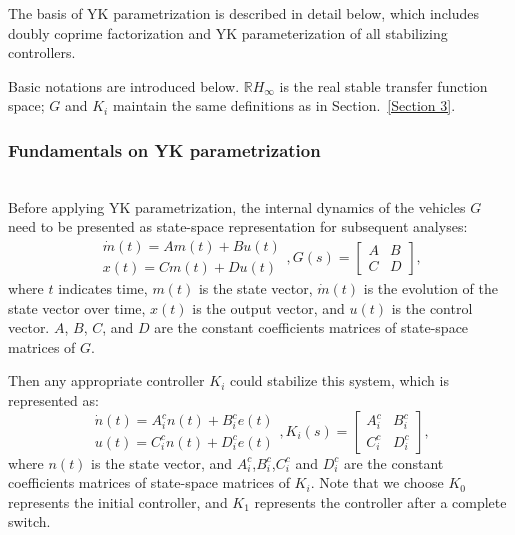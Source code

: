\documentclass[journal]{IEEEtran}
\begin{document}
The basis of YK parametrization is described in detail below, which includes doubly coprime factorization and YK parameterization of all stabilizing controllers.

Basic notations are introduced below. $\mathbb{R} H_{\infty}$ is the real stable transfer function space; $G$ and $K_i$ maintain the same definitions as in Section.~\ref{Section 3}.

\subsubsection{Fundamentals on YK parametrization}
\label{Section 3.2.1}
~\\


Before applying YK parametrization, the internal dynamics of the vehicles $G$ need to be presented as state-space representation for subsequent analyses:
\begin{equation}
  \begin{gathered}
    \dot{m}(t)=A m(t)+B u(t) \\
    x(t)=C m(t)+D u(t)
  \end{gathered}, G(s)=\left[\begin{array}{ll}
      A & B \\
      C & D
    \end{array}\right],
\end{equation}
where $t$ indicates time, $m(t)$ is the state vector, $\dot{m}(t)$ is the evolution of the state vector over time, $x(t)$ is the output vector, and $u(t)$ is the control vector. $A$, $B$, $C$, and $D$ are the constant coefficients matrices of state-space matrices of $G$.

Then any appropriate controller $K_i$ could stabilize this system, which is represented as:
\begin{equation}
  \begin{gathered}
    \dot{n}(t)=A_{i}^{c} n(t)+B_{i}^{c} e(t) \\
    u(t)=C_{i}^{c} n(t)+D_{i}^{c} e(t)
  \end{gathered}, K_{i}(s)=\left[\begin{array}{ll}
      A_{i}^{c} & B_{i}^{c} \\
      C_{i}^{c} & D_{i}^{c}
    \end{array}\right],
\end{equation}
where $n(t)$ is the state vector, and $A_i^c$,$B_i^c$,$C_i^c$ and $D_i^c$ are the constant coefficients matrices of state-space matrices of $K_i$. Note that we choose $K_0$ represents the initial controller, and $K_1$ represents the controller after a complete switch.
\end{document}
